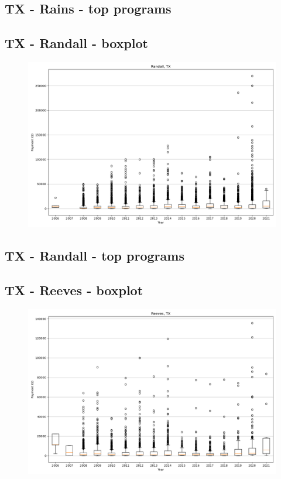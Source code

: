 \subsection*{TX - Rains - top programs}

\newpage
\subsection*{TX - Randall - boxplot}
\begin{figure}[h]
\centering
\includegraphics[width=7in]{../output/boxplots/counties/Randall-TX_boxplot.png}
\end{figure}


\subsection*{TX - Randall - top programs}

\newpage
\subsection*{TX - Reeves - boxplot}
\begin{figure}[h]
\centering
\includegraphics[width=7in]{../output/boxplots/counties/Reeves-TX_boxplot.png}
\end{figure}


